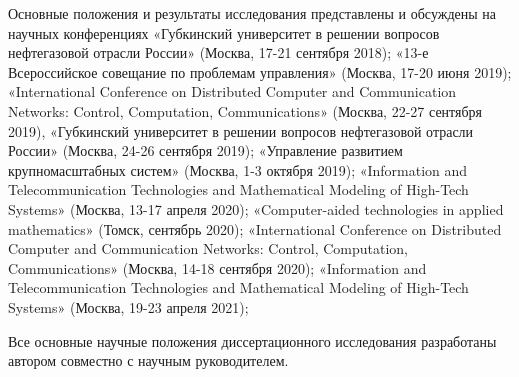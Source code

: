 


{\probation}
Основные положения и результаты исследования представлены и обсуждены на научных конференциях «Губкинский университет в решении вопросов нефтегазовой отрасли России» (Москва, 17-21 сентября 2018); «13-е Всероссийское совещание по проблемам управления» (Москва, 17-20 июня 2019); «International Conference on Distributed Computer and Communication Networks: Control, Computation, Communications» (Москва, 22-27 сентября 2019), «Губкинский университет в решении вопросов нефтегазовой отрасли России» (Москва, 24-26 сентября 2019); «Управление развитием крупномасштабных систем» (Москва, 1-3 октября 2019); «Information and Telecommunication Technologies and Mathematical Modeling of High-Tech Systems» (Москва, 13-17 апреля 2020); «Computer-aided technologies in applied mathematics» (Томск, сентябрь 2020); «International Conference on Distributed Computer and Communication Networks: Control, Computation, Communications» (Москва, 14-18 сентября 2020); «Information and Telecommunication Technologies and Mathematical Modeling of High-Tech Systems» (Москва, 19-23 апреля 2021);


{\contribution} Все основные научные положения диссертационного исследования разработаны автором совместно с научным руководителем.

